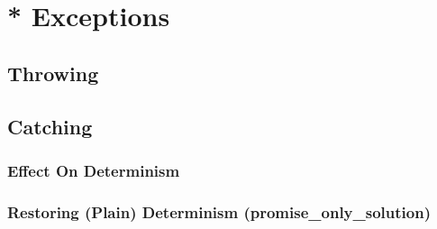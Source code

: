 
\chapter{* Exceptions}
\section{Throwing}
\section{Catching}
\subsection{Effect On Determinism}
\subsection{Restoring (Plain) Determinism (promise\_only\_solution)}



